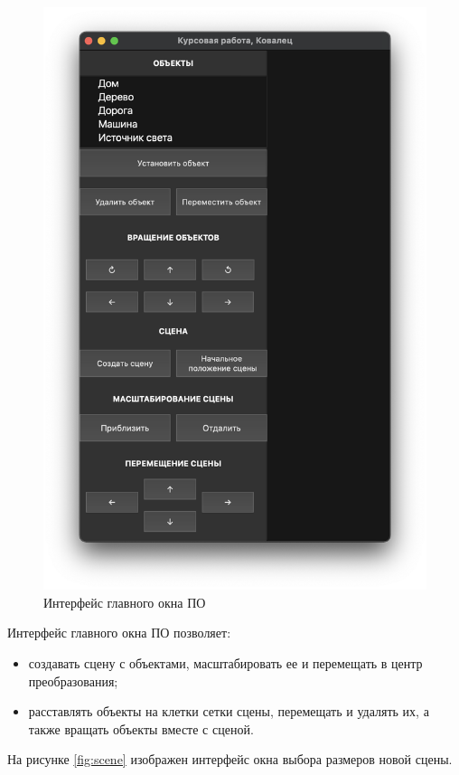 \documentclass[a4paper,14pt, unknownkeysallowed]{extreport}
\begin{document}
\begin{figure}[h]
	\centering
	\includegraphics[scale=0.5]{img/interface.png}
	\caption{Интерфейс главного окна ПО}
	\label{fig:interface}
\end{figure} 

Интерфейс главного окна ПО позволяет: 
\begin{itemize}
	\item создавать сцену с объектами, масштабировать ее и перемещать в центр преобразования;
	\item расставлять объекты на клетки сетки сцены, перемещать и удалять их, а также вращать объекты вместе с сценой.
\end{itemize}

На рисунке \ref{fig:scene} изображен интерфейс окна выбора размеров новой сцены. 
\end{document}

